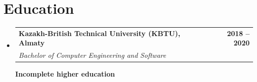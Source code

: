 \documentclass[letterpaper,11pt]{article}
\makeatletter
\newcommand{\resumeSubheading}[4]{
  \vspace{-2pt}\item
    \begin{tabular*}{1.0\textwidth}[t]{l@{\extracolsep{\fill}}r}
      \textbf{#1} & \textbf{\small #2} \\
      \textit{\small#3} & \textit{\small #4} \\
    \end{tabular*}\vspace{-7pt}
}
\newcommand{\resumeSubHeadingListStart}{\begin{itemize}[leftmargin=0.0in, label={}]}
\newcommand{\resumeSubHeadingListEnd}{\end{itemize}}
\makeatother
\begin{document}
\section{Education}
  \resumeSubHeadingListStart
    \resumeSubheading
      {Kazakh-British Technical University (KBTU), Almaty}{2018 -- 2020}
      {Bachelor of Computer Engineering and Software}{}

      \small{\textbf{Incomplete higher education}}
  \resumeSubHeadingListEnd
\vspace{-18pt}
\end{document}
